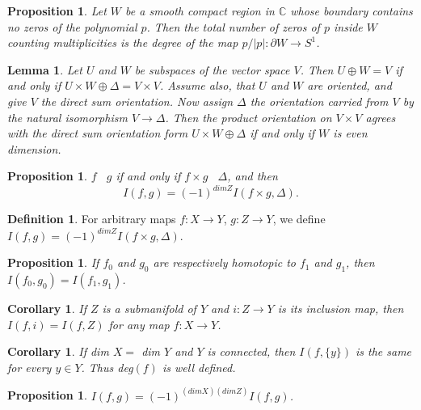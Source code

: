 \documentclass[psamsfonts]{amsart}
\newtheorem{cor}[theorem]{Corollary}
\newtheorem{prop}[theorem]{Proposition}
\newtheorem{lem}[theorem]{Lemma}
\theoremstyle{definition}
\newtheorem{defn}[theorem]{Definition}
\theoremstyle{remark}
\numberwithin{equation}{section}
\begin{document}
		\begin{prop}
			Let $W$ be a smooth compact region in $\mathbb{C}$ whose boundary contains no zeros of the polynomial $p$. Then the total number of zeros of $p$ inside $W$ counting multiplicities is the degree of the map $p/|p|: \partial W \to S^1$.
		\end{prop}
		\begin{lem}
			Let $U$ and $W$ be subspaces of the vector space $V$. Then $U \oplus W = V$ if and only if $U \times W \oplus \Delta = V \times V$. Assume also, that $U$ and $W$ are oriented, and give $V$ the direct sum orientation. Now assign $\Delta$ the orientation carried from $V$ by the natural isomorphism $V \to \Delta$. Then the product orientation on $V \times V$ agrees with the direct sum orientation form $U \times W \oplus \Delta$ if and only if $W$ is even dimension.
		\end{lem}
		\begin{prop}
			$f$ \;\;\makebox[0pt]{$\top$}\makebox[0pt]{$\cap$}\;\ $g$ if and only if $f\times g$ \;\;\makebox[0pt]{$\top$}\makebox[0pt]{$\cap$}\;\ $\Delta$, and then
			\begin{equation}
				I(f,g) = (-1)^{dim Z}I(f\times g, \Delta).
			\end{equation}
		\end{prop}
		\begin{defn}
			For arbitrary maps $f: X \to Y$, $g: Z \to Y$, we define $I(f,g) = (-1)^{dimZ}I(f\times g, \Delta)$.
		\end{defn}
		\begin{prop}
			If $f_0$ and $g_0$ are respectively homotopic to $f_1$ and $g_1$, then $I(f_0,g_0)= I(f_1,g_1)$.
		\end{prop}
		\begin{cor}
			If $Z$ is a submanifold of $Y$ and $i: Z \to Y$ is its inclusion map, then $I(f,i) = I(f,Z)$ for any map $f: X \to Y$.
		\end{cor}
		\begin{cor}
			If dim $X =$ dim $Y$ and $Y$ is connected, then $I(f,\{y\})$ is the same for every $y \in Y$. Thus deg$(f)$ is well defined.
		\end{cor}
		\begin{prop}
			$I(f,g)=(-1)^{(dim X)(dim Z)}I(f,g)$.
		\end{prop}
\end{document}
